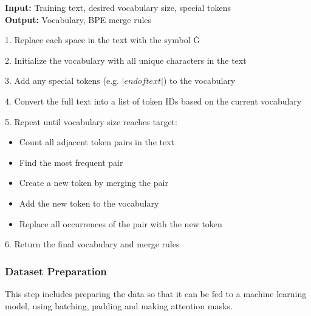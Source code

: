 \begin{algorithm}[H]
\caption{Train BPE Tokenizer}

\textbf{Input:} Training text, desired vocabulary size, special tokens \\
\textbf{Output:} Vocabulary, BPE merge rules

1. Replace each space in the text with the symbol Ġ

2. Initialize the vocabulary with all unique characters in the text\;

3. Add any special tokens (e.g. $|endoftext|$) to the vocabulary\;

4. Convert the full text into a list of token IDs based on the current vocabulary\;

5. Repeat until vocabulary size reaches target:
    \begin{itemize}
        \item Count all adjacent token pairs in the text
        \item Find the most frequent pair
        \item Create a new token by merging the pair
        \item Add the new token to the vocabulary
        \item Replace all occurrences of the pair with the new token
    \end{itemize}

6. Return the final vocabulary and merge rules
\end{algorithm}

\subsubsection{Dataset Preparation}

This step includes preparing the data so that it can be fed to a machine learning model, using batching, padding and making attention masks.

